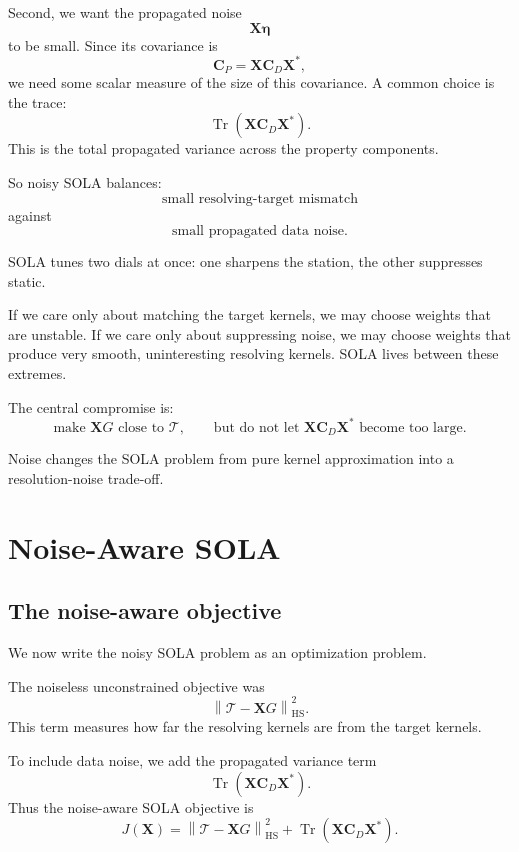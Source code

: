 \documentclass[11pt,openany]{book}
\theoremstyle{definition}
\theoremstyle{remark}
\newcommand{\Tau}{\mathcal{T}}
\newcommand{\Tr}{\operatorname{Tr}}
\newcommand{\HS}{\mathrm{HS}}
\begin{document}
Second, we want the propagated noise
\[
  \mathbf X\boldsymbol\eta
\]
to be small. Since its covariance is
\[
  \mathbf C_P=\mathbf X\mathbf C_D\mathbf X^*,
\]
we need some scalar measure of the size of this covariance. A common choice is the trace:
\[
  \Tr(\mathbf X\mathbf C_D\mathbf X^*).
\]
This is the total propagated variance across the property components.

So noisy SOLA balances:
\[
  \text{small resolving-target mismatch}
\]
against
\[
  \text{small propagated data noise}.
\]

\begin{intuitionbox}
SOLA tunes two dials at once: one sharpens the station, the other suppresses static.
\end{intuitionbox}

If we care only about matching the target kernels, we may choose weights that are unstable.
If we care only about suppressing noise, we may choose weights that produce very smooth,
uninteresting resolving kernels. SOLA lives between these extremes.

The central compromise is:
\[
  \text{make }\mathbf XG\text{ close to }\Tau,
  \qquad
  \text{but do not let }\mathbf X\mathbf C_D\mathbf X^*\text{ become too large}.
\]

\begin{checkpointbox}
Noise changes the SOLA problem from pure kernel approximation into a resolution-noise
trade-off.
\end{checkpointbox}

\chapter{Noise-Aware SOLA}

\section{The noise-aware objective}

We now write the noisy SOLA problem as an optimization problem.

The noiseless unconstrained objective was
\[
  \left\|
    \Tau-\mathbf XG
  \right\|_{\HS}^2.
\]
This term measures how far the resolving kernels are from the target kernels.

To include data noise, we add the propagated variance term
\[
  \Tr(\mathbf X\mathbf C_D\mathbf X^*).
\]
Thus the noise-aware SOLA objective is
\[
  J(\mathbf X)
  =
  \left\|
    \Tau-\mathbf XG
  \right\|_{\HS}^2
  +
  \Tr(\mathbf X\mathbf C_D\mathbf X^*).
\]
\end{document}
